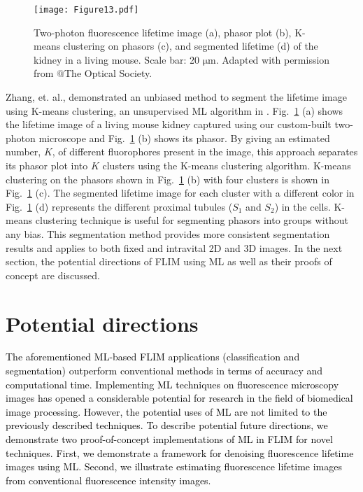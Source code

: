 \documentclass[12pt]{iopart}
\newcommand{\cc}[1]{\textcolor{black}{#1}}
\begin{document}
\begin{figure}[!t]
\centering
\texttt{[image: Figure13.pdf]}
\caption{Two-photon fluorescence lifetime image (a), phasor plot (b), K-means clustering on phasors (c), and segmented lifetime (d) of the kidney in a living mouse. Scale bar: 20 $\mathrm{\mu}$m. Adapted with permission from \cite{phasors} $@$The Optical Society.}\label{fig1_phasor}
\end{figure}

Zhang, et. al., demonstrated an unbiased method to segment the lifetime image using K-means clustering, an unsupervised ML algorithm in \cite{phasors}. Fig.~\ref{fig1_phasor} (a) shows the lifetime image of a living mouse kidney captured using our custom-built two-photon microscope \cite{instant_flim} and Fig.~\ref{fig1_phasor} (b) shows its phasor. By giving an estimated number, $K$, of different fluorophores present in the image, this approach separates its phasor plot into $K$ clusters using the K-means clustering algorithm. K-means clustering on the phasors shown in Fig.~\ref{fig1_phasor} (b) with four clusters is shown in Fig.~\ref{fig1_phasor} (c). The segmented lifetime image for each cluster with a different color in Fig.~\ref{fig1_phasor} (d) represents the different proximal tubules ($S_1$ and $S_2$) in the cells. K-means clustering technique is useful for segmenting phasors into groups without any bias. This segmentation method provides more consistent segmentation results and applies to both fixed and intravital 2D and 3D images. In the next section, the potential directions of FLIM using ML as well as their proofs of concept are discussed.

\section{Potential directions}\label{potential_dir}
\cc{The aforementioned ML-based FLIM applications (classification and segmentation) outperform conventional methods in terms of accuracy and computational time. Implementing ML techniques on fluorescence microscopy images has opened a considerable potential for research in the field of biomedical image processing. However, the potential uses of ML are not limited to the previously described techniques. To describe potential future directions, we demonstrate two proof-of-concept implementations of ML in FLIM for novel techniques. First, we demonstrate a framework for denoising fluorescence lifetime images using ML. Second, we illustrate estimating fluorescence lifetime images from conventional fluorescence intensity images.}
\end{document}
